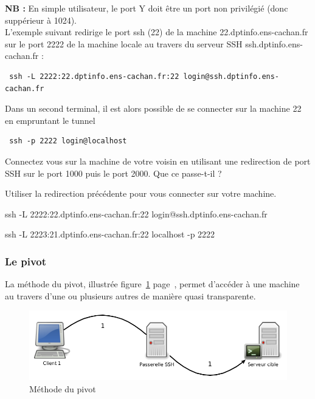 \documentclass[11pt]{article}
\begin{document}
\noindent \textbf{NB : } En simple utilisateur, le port Y doit être un port non privilégié (donc suppérieur à 1024).\\

L'exemple suivant redirige le port ssh (22) de la machine 22.dptinfo.ens-cachan.fr sur le port 2222 de la machine locale au travers du serveur SSH ssh.dptinfo.ens-cachan.fr :

\begin{lstlisting}
 ssh -L 2222:22.dptinfo.ens-cachan.fr:22 login@ssh.dptinfo.ens-cachan.fr
\end{lstlisting}

Dans un second terminal, il est alors possible de se connecter sur la machine 22 en empruntant le tunnel 

\begin{lstlisting}
 ssh -p 2222 login@localhost
\end{lstlisting}

Connectez vous sur la machine de votre voisin en utilisant une redirection de port SSH sur le port 1000 puis le port 2000. Que ce passe-t-il ?

Utiliser la redirection précédente pour vous connecter sur votre machine.

\begin{solution}

ssh -L 2222:22.dptinfo.ens-cachan.fr:22 login@ssh.dptinfo.ens-cachan.fr

ssh -L 2223:21.dptinfo.ens-cachan.fr:22 localhost -p 2222

\end{solution}

\subsubsection{Le pivot}

La méthode du pivot, illustrée figure~\ref{pivot} page~\pageref{pivot}, permet d'accéder à une machine au travers d'une ou plusieurs autres de manière quasi transparente.\\

\begin{figure}[h]
 \centering
 \includegraphics[width=15cm]{pivot}
 \caption{\label{pivot}Méthode du pivot}
\end{figure}
\end{document}
